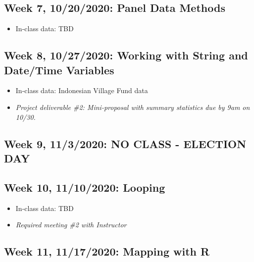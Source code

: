 \documentclass[11pt,]{article}
\providecommand{\tightlist}{%
  \setlength{\itemsep}{0pt}\setlength{\parskip}{0pt}}
\begin{document}
\hypertarget{week-7-10202020-panel-data-methods}{%
\subsection{Week 7, 10/20/2020: Panel Data
Methods}\label{week-7-10202020-panel-data-methods}}

\begin{itemize}
\tightlist
\item
  In-class data: TBD \medskip
\end{itemize}

\hypertarget{week-8-10272020-working-with-string-and-datetime-variables}{%
\subsection{Week 8, 10/27/2020: Working with String and Date/Time
Variables}\label{week-8-10272020-working-with-string-and-datetime-variables}}

\begin{itemize}
\tightlist
\item
  In-class data: Indonesian Village Fund data
\item
  \emph{Project deliverable \#2: Mini-proposal with summary statistics
  due by 9am on 10/30.} \medskip
\end{itemize}

\hypertarget{week-9-1132020-no-class---election-day}{%
\subsection{Week 9, 11/3/2020: NO CLASS - ELECTION
DAY}\label{week-9-1132020-no-class---election-day}}

\medskip

\hypertarget{week-10-11102020-looping}{%
\subsection{Week 10, 11/10/2020:
Looping}\label{week-10-11102020-looping}}

\begin{itemize}
\tightlist
\item
  In-class data: TBD
\item
  \emph{Required meeting \#2 with Instructor} \medskip
\end{itemize}

\hypertarget{week-11-11172020-mapping-with-r}{%
\subsection{Week 11, 11/17/2020: Mapping with
R}\label{week-11-11172020-mapping-with-r}}
\end{document}
